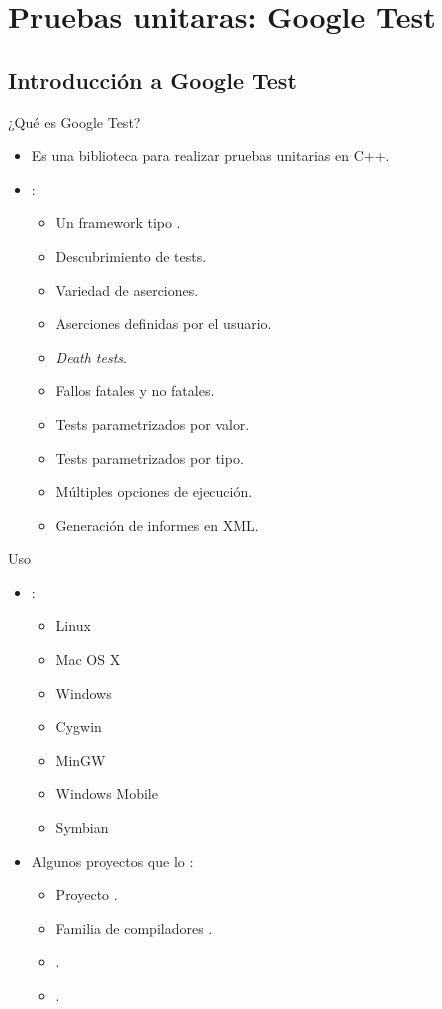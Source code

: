 \section{Pruebas unitaras: Google Test}

\subsection{Introducción a Google Test}

\begin{frame}[t]{¿Qué es Google Test?}
\begin{itemize}
  \item Es una biblioteca para realizar pruebas unitarias en C++.
  
  \vfill
  \item {}:
    \begin{itemize}
      \item Un framework tipo .
      \item Descubrimiento de tests.
      \item Variedad de aserciones.
      \item Aserciones definidas por el usuario.
      \item \emph{Death tests}.
      \item Fallos fatales y no fatales.
      \item Tests parametrizados por valor.
      \item Tests parametrizados por tipo.
      \item Múltiples opciones de ejecución.
      \item Generación de informes en XML.
    \end{itemize}

\end{itemize}
\end{frame}

\begin{frame}[t]{Uso}
\begin{itemize}
  \item {}:
    \begin{itemize}
      \item Linux
      \item Mac OS X
      \item Windows
      \item Cygwin
      \item MinGW
      \item Windows Mobile
      \item Symbian
    \end{itemize}
  \vfill
  \item Algunos proyectos que lo :
    \begin{itemize}
      \item Proyecto .
      \item Familia de compiladores .
      \item {}.
      \item {}.
    \end{itemize}
\end{itemize}
\end{frame}

